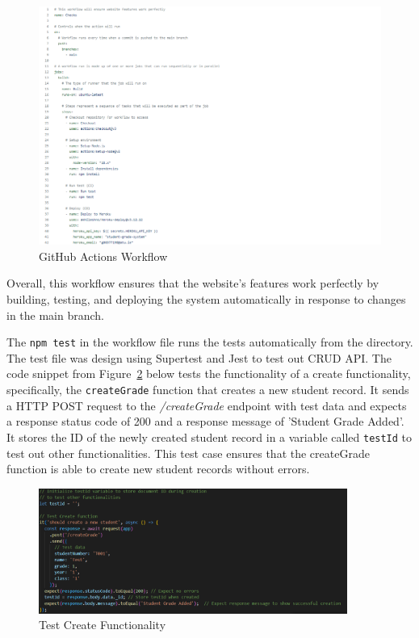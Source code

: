 \begin{figure}[h!]
    \centering
    \includegraphics[width=1.5\textwidth]{images/full-workflow.png}
    \caption{GitHub Actions Workflow}
    \label{image:full-workflow}
\end{figure}

Overall, this workflow ensures that the website's features work perfectly by building, testing, and deploying the system automatically in response to changes in the main branch.

The \texttt{npm test} in the workflow file runs the tests automatically from the directory. The test file was design using Supertest and Jest to test out CRUD API. The code snippet from Figure~\ref{image:test-create} below tests the functionality of a create functionality, specifically, the \texttt{createGrade} function that creates a new student record. It sends a HTTP POST request to the \textit{/createGrade} endpoint with test data and expects a response status code of 200 and a response message of 'Student Grade Added'. It stores the ID of the newly created student record in a variable called \texttt{testId} to test out other functionalities. This test case ensures that the createGrade function is able to create new student records without errors.

\begin{figure}[h!]
    \centering
    \includegraphics[width=0.9\textwidth]{images/test-create.png}
    \caption{Test Create Functionality}
    \label{image:test-create}
\end{figure}

